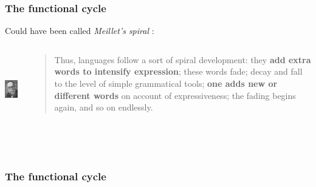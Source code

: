 \documentclass[compress]{beamer}
\begin{document}
\begin{frame}
\frametitle{The functional cycle}
Could have been called \emph{Meillet's spiral} \citep{vanderAuwera2009}:
\begin{columns}[T]  
   \begin{column}{.2\textwidth}
  	  \vspace{12pt}
	  \includegraphics[height=1.2in]{meillet.jpg}   
   \end{column}
   \begin{column}{.8\textwidth}
      \begin{block}{}
\begin{quote}
Thus, languages follow a sort of spiral development: they \textbf{add extra words to intensify expression}; these words fade; decay and fall to the level of simple grammatical tools; \textbf{one adds new or different words} on account of expressiveness; the fading begins again, and so on endlessly.
\end{quote}
	\end{block}
    \end{column}
  \end{columns}
 \vfill\hfill \citep{meillet1912}\\
\end{frame}


\begin{frame}
	\frametitle{The functional cycle}
\begin{center}
\end{center}
\end{frame}
\end{document}
